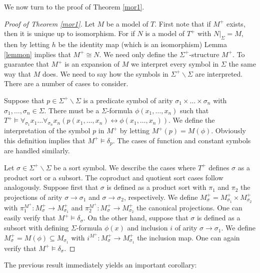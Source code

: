 We now turn to the proof of Theorem \ref{mor1}.

\begin{proof}[Proof of Theorem \ref{mor1}] Let $M$ be a model of
  $T$. First note that if $M^+$ exists, then it is unique up to
  isomorphism. For if $N$ is a model of $T^+$ with $N|_\Sigma=M$, then
  by letting $h$ be the identity map (which is an isomorphism) Lemma
  \ref{lemmon} implies that $M^+\cong N$. We need only define the
  $\Sigma^+$-structure $M^+$. To guarantee that $M^+$ is an expansion
  of $M$ we interpret every symbol in $\Sigma$ the same way that $M$
  does. We need to say how the symbols in $\Sigma^+\backslash\Sigma$
  are interpreted. There are a number of cases to consider.

  Suppose that $p\in\Sigma^+\backslash\Sigma$ is a predicate symbol of
  arity $\sigma_1\times\ldots\times\sigma_n$ with
  $\sigma_1,\ldots,\sigma_n\in\Sigma$. There must be a
  $\Sigma$-formula $\phi(x_1,\ldots, x_n)$ such that
  $T^+\vDash\forall_{\sigma_1}x_1\ldots\forall_{\sigma_n}x_n(p(x_1,\ldots,
  x_n)\leftrightarrow\phi(x_1,\ldots, x_n))$. We define the
  interpretation of the symbol $p$ in $M^+$ by letting
  $M^+(p)=M(\phi )$.  Obviously this definition implies that
  $M^+\vDash\delta_p$. The cases of function and constant symbols are
  handled similarly.

  Let $\sigma\in\Sigma^+\backslash\Sigma$ be a sort symbol. We
  describe the cases where $T^+$ defines $\sigma$ as a product sort or
  a subsort. The coproduct and quotient sort cases follow
  analogously. Suppose first that $\sigma$ is defined as a product
  sort with $\pi_1$ and $\pi_2$ the projections of arity
  $\sigma\rightarrow\sigma_1$ and $\sigma\rightarrow\sigma_2$,
  respectively. We define
  $M_\sigma^+=M^+_{\sigma_1}\times M^+_{\sigma_2}$ with
  $\pi_1^{M^+}:M^+_\sigma\rightarrow M^+_{\sigma_1}$ and
  $\pi_2^{M^+}:M^+_\sigma\rightarrow M^+_{\sigma_2}$ the canonical
  projections. One can easily verify that $M^+\vDash\delta_\sigma$. On
  the other hand, suppose that $\sigma$ is defined as a subsort with
  defining $\Sigma$-formula $\phi(x)$ and inclusion $i$ of arity
  $\sigma\rightarrow\sigma_1$. We define
  $M_\sigma^+=M(\phi )\subseteq M_{\sigma_1}$ with
  $i^{M^+}:M_\sigma^+\rightarrow M^+_{\sigma_1}$ the inclusion
  map. One can again verify that $M^+\vDash\delta_\sigma$.
\end{proof}

The previous result immediately yields an important corollary:

